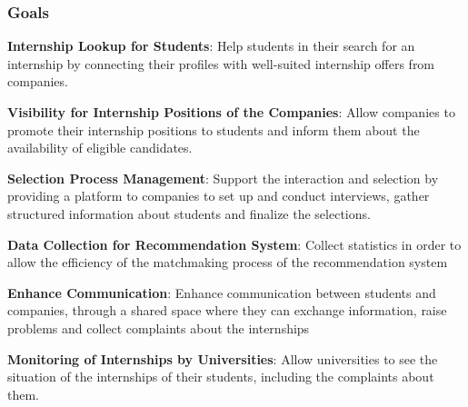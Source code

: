     \subsubsection{Goals}
        \begin{enumerate}[label={[G\arabic*]}]
            \item \textbf{Internship Lookup for Students}: 
                Help students in their search for an internship by connecting their profiles with well-suited internship offers from companies.
            \item \textbf{Visibility for Internship Positions of the Companies}: 
                Allow companies to promote their internship positions to students and inform them about the availability of eligible candidates.
            \item \textbf{Selection Process Management}: 
                Support the interaction and selection by providing a platform to companies to set up and conduct interviews, gather structured information about students and finalize the selections.
            \item \textbf{Data Collection for Recommendation System}: 
                Collect statistics in order to allow the efficiency of the matchmaking process of the recommendation system 
            \item \textbf{Enhance Communication}: 
                Enhance communication between students and companies, through a shared space where they can exchange information, raise problems and collect complaints about the internships
            \item \textbf{Monitoring of Internships by Universities}: 
                Allow universities to see the situation of the internships of their students, including the complaints about them.
        \end{enumerate}


